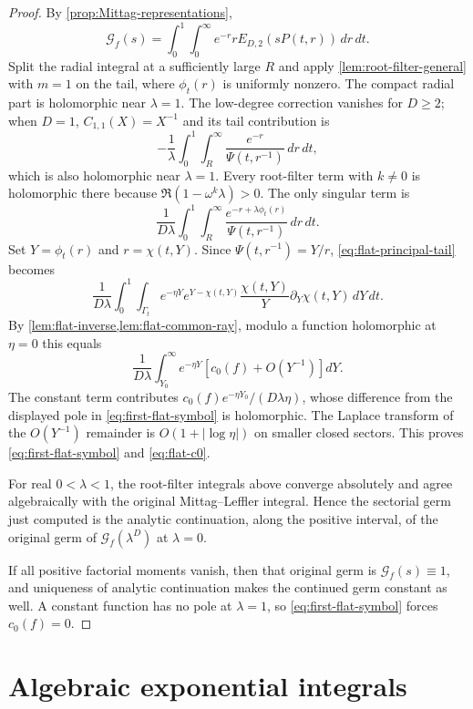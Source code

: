 \documentclass[11pt]{article}
\numberwithin{equation}{section}
\theoremstyle{definition}
\theoremstyle{remark}
\newcommand{\Gcal}{\mathcal G}
\begin{document}
\begin{proof}
By \cref{prop:Mittag-representations},
\[
  \Gcal_f(s)=\int_0^1\int_0^\infty
  e^{-r}rE_{D,2}(sP(t,r))\,dr\,dt.
\]
Split the radial integral at a sufficiently large $R$ and apply
\cref{lem:root-filter-general} with $m=1$ on the tail, where $\phi_t(r)$ is
uniformly nonzero.  The compact radial part is holomorphic near
$\lambda=1$.  The low-degree correction vanishes for $D\ge2$; when $D=1$,
$C_{1,1}(X)=X^{-1}$ and its tail contribution is
\[
  -\frac1\lambda\int_0^1\int_R^\infty
  \frac{e^{-r}}{\Psi(t,r^{-1})}\,dr\,dt,
\]
which is also holomorphic near $\lambda=1$.  Every root-filter term with
$k\neq0$ is holomorphic there because
$\Re(1-\omega^k\lambda)>0$.  The only singular term is
\begin{equation}\label{eq:flat-principal-tail}
  \frac1{D\lambda}\int_0^1\int_R^\infty
  \frac{e^{-r+\lambda\phi_t(r)}}{\Psi(t,r^{-1})}\,dr\,dt.
\end{equation}
Set $Y=\phi_t(r)$ and $r=\chi(t,Y)$.  Since
$\Psi(t,r^{-1})=Y/r$, \eqref{eq:flat-principal-tail} becomes
\[
  \frac1{D\lambda}\int_0^1\int_{\Gamma_t}
  e^{-\eta Y}
  e^{Y-\chi(t,Y)}\frac{\chi(t,Y)}Y\partial_Y\chi(t,Y)
  \,dY\,dt.
\]
By \cref{lem:flat-inverse,lem:flat-common-ray}, modulo a function
holomorphic at $\eta=0$ this equals
\[
  \frac1{D\lambda}\int_{Y_0}^\infty e^{-\eta Y}
  \left[c_0(f)+O(Y^{-1})\right]dY.
\]
The constant term contributes
$c_0(f)e^{-\eta Y_0}/(D\lambda\eta)$, whose difference from the displayed
pole in \eqref{eq:first-flat-symbol} is holomorphic.  The Laplace transform
of the $O(Y^{-1})$ remainder is $O(1+|\log\eta|)$ on smaller closed sectors.
This proves \eqref{eq:first-flat-symbol} and \eqref{eq:flat-c0}.

For real $0<\lambda<1$, the root-filter integrals above converge absolutely
and agree algebraically with the original Mittag--Leffler integral.  Hence
the sectorial germ just computed is the analytic continuation, along the
positive interval, of the original germ of $\Gcal_f(\lambda^D)$ at
$\lambda=0$.

If all positive factorial moments vanish, then that original germ is
$\Gcal_f(s)\equiv1$, and uniqueness of analytic continuation makes the
continued germ constant as well.  A constant function has no pole at
$\lambda=1$, so \eqref{eq:first-flat-symbol} forces $c_0(f)=0$.
\end{proof}


\section{Algebraic exponential integrals}\label{sec:exp-integrals}
\end{document}
